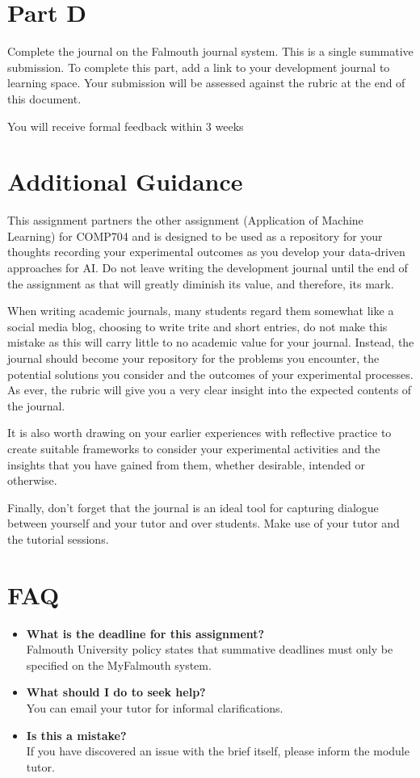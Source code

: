 \documentclass{../common/fal_assignment}
\begin{document}
\section*{Part D}
Complete the journal on the Falmouth journal system.
This is a single summative submission. To complete this part, add a link to your development journal to learning space. Your submission will be assessed against the rubric at the end of this document.

You will receive formal feedback within 3 weeks

\section*{Additional Guidance}
This assignment partners the other assignment (Application of Machine Learning) for COMP704 and is designed to be used as a repository for your thoughts recording your experimental outcomes as you develop your data-driven approaches for AI. Do not leave writing the development journal until the end of the assignment as that will greatly diminish its value, and therefore, its mark.

When writing academic journals, many students regard them somewhat like a social media blog, choosing to write trite and short entries, do not make this mistake as this will carry little to no academic value for your journal. Instead, the journal should become your repository for the problems you encounter, the potential solutions you consider and the outcomes of your experimental processes. As ever, the rubric will give you a very clear insight into the expected contents of the journal.

It is also worth drawing on your earlier experiences with reflective practice to create suitable frameworks to consider your experimental activities and the insights that you have gained from them, whether desirable, intended or otherwise.

Finally, don't forget that the journal is an ideal tool for capturing dialogue between yourself and your tutor and over students. Make use of your tutor and the tutorial sessions.

\section*{FAQ}

\begin{itemize}
	\item 	\textbf{What is the deadline for this assignment?} \\ 
    		Falmouth University policy states that summative deadlines must only be specified on the MyFalmouth system.
    		
	\item 	\textbf{What should I do to seek help?} \\ 
    		You can email your tutor for informal clarifications.
    		
    	\item 	\textbf{Is this a mistake?} \\ 	
    		If you have discovered an issue with the brief itself, please inform the module tutor.
    		
\end{itemize}
\end{document}
